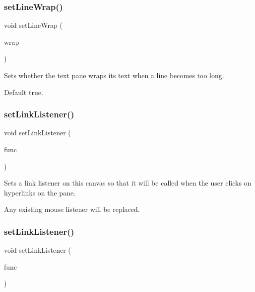 \subsubsection{\texorpdfstring{set\+Line\+Wrap()}{setLineWrap()}}
{\footnotesize\ttfamily void set\+Line\+Wrap (\begin{DoxyParamCaption}\item[{bool}]{wrap }\end{DoxyParamCaption})\hspace{0.3cm}{\ttfamily [virtual]}}



Sets whether the text pane wraps its text when a line becomes too long. 

Default true. \mbox{\label{classGBrowserPane_aaa849c4aed1fa43178314f5c76e43081}} 
\subsubsection{\texorpdfstring{set\+Link\+Listener()}{setLinkListener()}\hspace{0.1cm}{\footnotesize\ttfamily [1/2]}}
{\footnotesize\ttfamily void set\+Link\+Listener (\begin{DoxyParamCaption}\item[{G\+Event\+Listener}]{func }\end{DoxyParamCaption})\hspace{0.3cm}{\ttfamily [virtual]}}



Sets a link listener on this canvas so that it will be called when the user clicks on hyperlinks on the pane. 

Any existing mouse listener will be replaced. \mbox{\label{classGBrowserPane_aca745635b2c4ceb74587ca5cfc26f0c3}} 
\subsubsection{\texorpdfstring{set\+Link\+Listener()}{setLinkListener()}\hspace{0.1cm}{\footnotesize\ttfamily [2/2]}}
{\footnotesize\ttfamily void set\+Link\+Listener (\begin{DoxyParamCaption}\item[{G\+Event\+Listener\+Void}]{func }\end{DoxyParamCaption})\hspace{0.3cm}{\ttfamily [virtual]}}




